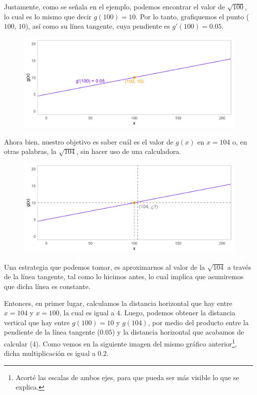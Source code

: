 \documentclass[12pt]{article}
\begin{document}
Justamente, como se señala en el ejemplo, podemos encontrar el valor de $\sqrt{100}$, lo cual es lo mismo que decir $g(100) = 10$. Por lo tanto, grafiquemos el punto ($100$, $10$), así como su línea tangente, cuya pendiente es $g'(100) = 0.05$.

\begin{figure}[hbt!]
\centering
\includegraphics[scale=0.7]{img/approx_lin_sqrt.jpg}
\end{figure}

Ahora bien, nuestro objetivo es saber cuál es el valor de $g(x)$ en $x = 104$ o, en otras palabras, la $\sqrt{104}$, sin hacer uso de una calculadora.

\newpage

\begin{figure}[hbt!]
\centering
\includegraphics[scale=0.7]{img/approx_lin_sqrt_2.jpg}
\end{figure}

Una estrategia que podemos tomar, es aproximarnos al valor de la $\sqrt{104}$ a través de la línea tangente, tal como lo hicimos antes, lo cual implica que asumiremos que dicha línea es constante.

Entonces, en primer lugar, calculamos la distancia horizontal que hay entre $x = 104$ y $x = 100$, la cual es igual a $4$. Luego, podemos obtener la distancia vertical que hay entre $g(100) = 10$ y $g(104)$, por medio del producto entre la pendiente de la línea tangente ($0.05$) y la distancia horizontal que acabamos de calcular ($4$). Como vemos en la siguiente imagen del mismo gráfico anterior\footnote{Acorté las escalas de ambos ejes, para que pueda ser más visible lo que se explica.}, dicha multiplicación es igual a $0.2$.
\end{document}
